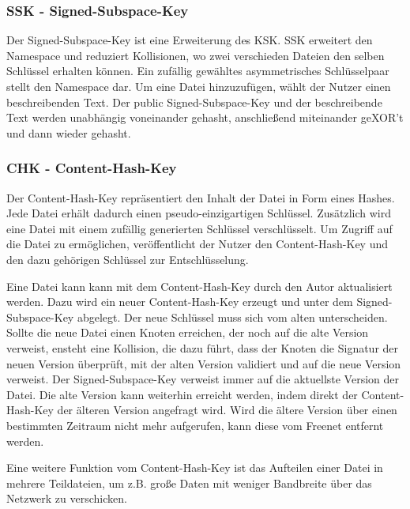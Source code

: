 \subsubsection{SSK - Signed-Subspace-Key}
Der Signed-Subspace-Key ist eine Erweiterung des KSK. SSK erweitert den
Namespace und reduziert Kollisionen, wo zwei verschieden Dateien den
selben Schlüssel erhalten können.
Ein zufällig gewähltes asymmetrisches Schlüsselpaar stellt den Namespace dar.
Um eine Datei hinzuzufügen, wählt der Nutzer einen beschreibenden Text. Der
public Signed-Subspace-Key und der beschreibende Text werden unabhängig
voneinander gehasht, anschließend miteinander geXOR't und dann wieder gehasht.

\subsubsection{CHK - Content-Hash-Key}
Der Content-Hash-Key repräsentiert den Inhalt der Datei in Form eines Hashes.
Jede Datei erhält dadurch einen pseudo-einzigartigen Schlüssel. Zusätzlich wird
eine Datei mit einem zufällig generierten Schlüssel verschlüsselt.
Um Zugriff auf die Datei zu ermöglichen, veröffentlicht der Nutzer den
Content-Hash-Key und den dazu gehörigen Schlüssel zur Entschlüsselung.

Eine Datei kann kann mit dem Content-Hash-Key durch den Autor aktualisiert
werden. Dazu wird ein neuer Content-Hash-Key erzeugt und unter dem
Signed-Subspace-Key abgelegt. Der neue Schlüssel muss sich vom alten
unterscheiden. Sollte die neue Datei einen Knoten erreichen, der noch auf die
alte Version verweist, ensteht eine Kollision, die dazu führt, dass der Knoten
die Signatur der neuen Version überprüft, mit der alten Version validiert und
auf die neue Version verweist. Der Signed-Subspace-Key
verweist immer auf die aktuellste Version der Datei. Die alte Version kann
weiterhin erreicht werden, indem direkt der Content-Hash-Key der älteren
Version angefragt wird. Wird die ältere Version über einen bestimmten
Zeitraum nicht mehr aufgerufen, kann diese vom Freenet entfernt werden.

Eine weitere Funktion vom Content-Hash-Key ist das Aufteilen einer Datei
in mehrere Teildateien, um z.B. große Daten mit weniger Bandbreite über das
Netzwerk zu verschicken.
